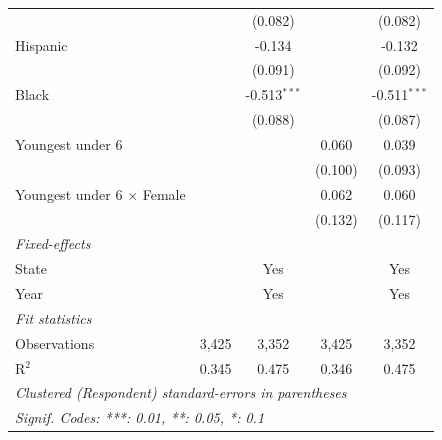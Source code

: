 \begin{tabular}{lcccc}
                                       &                & (0.082)        &                & (0.082)\\   
   Hispanic                            &                & -0.134         &                & -0.132\\   
                                       &                & (0.091)        &                & (0.092)\\   
   Black                               &                & -0.513$^{***}$ &                & -0.511$^{***}$\\   
                                       &                & (0.088)        &                & (0.087)\\   
   Youngest under 6                    &                &                & 0.060          & 0.039\\   
                                       &                &                & (0.100)        & (0.093)\\   
   Youngest under 6 $\times$ Female    &                &                & 0.062          & 0.060\\   
                                       &                &                & (0.132)        & (0.117)\\   
   \midrule
   \emph{Fixed-effects}\\
   State                               &                & Yes            &                & Yes\\  
   Year                                &                & Yes            &                & Yes\\  
   \midrule
   \emph{Fit statistics}\\
   Observations                        & 3,425          & 3,352          & 3,425          & 3,352\\  
   R$^2$                               & 0.345          & 0.475          & 0.346          & 0.475\\  
   \midrule \midrule
   \multicolumn{5}{l}{\emph{Clustered (Respondent) standard-errors in parentheses}}\\
   \multicolumn{5}{l}{\emph{Signif. Codes: ***: 0.01, **: 0.05, *: 0.1}}\\
\end{tabular}
\par\endgroup


